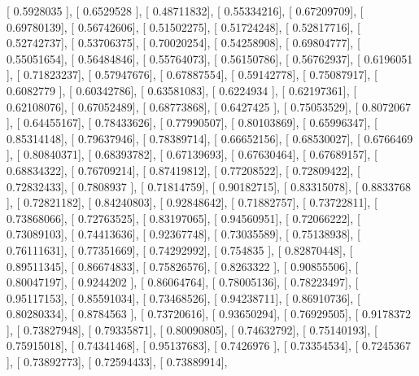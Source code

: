 \documentclass{article}
\begin{document}
       [ 0.5928035 ],
       [ 0.6529528 ],
       [ 0.48711832],
       [ 0.55334216],
       [ 0.67209709],
       [ 0.69780139],
       [ 0.56742606],
       [ 0.51502275],
       [ 0.51724248],
       [ 0.52817716],
       [ 0.52742737],
       [ 0.53706375],
       [ 0.70020254],
       [ 0.54258908],
       [ 0.69804777],
       [ 0.55051654],
       [ 0.56484846],
       [ 0.55764073],
       [ 0.56150786],
       [ 0.56762937],
       [ 0.6196051 ],
       [ 0.71823237],
       [ 0.57947676],
       [ 0.67887554],
       [ 0.59142778],
       [ 0.75087917],
       [ 0.6082779 ],
       [ 0.60342786],
       [ 0.63581083],
       [ 0.6224934 ],
       [ 0.62197361],
       [ 0.62108076],
       [ 0.67052489],
       [ 0.68773868],
       [ 0.6427425 ],
       [ 0.75053529],
       [ 0.8072067 ],
       [ 0.64455167],
       [ 0.78433626],
       [ 0.77990507],
       [ 0.80103869],
       [ 0.65996347],
       [ 0.85314148],
       [ 0.79637946],
       [ 0.78389714],
       [ 0.66652156],
       [ 0.68530027],
       [ 0.6766469 ],
       [ 0.80840371],
       [ 0.68393782],
       [ 0.67139693],
       [ 0.67630464],
       [ 0.67689157],
       [ 0.68834322],
       [ 0.76709214],
       [ 0.87419812],
       [ 0.77208522],
       [ 0.72809422],
       [ 0.72832433],
       [ 0.7808937 ],
       [ 0.71814759],
       [ 0.90182715],
       [ 0.83315078],
       [ 0.8833768 ],
       [ 0.72821182],
       [ 0.84240803],
       [ 0.92848642],
       [ 0.71882757],
       [ 0.73722811],
       [ 0.73868066],
       [ 0.72763525],
       [ 0.83197065],
       [ 0.94560951],
       [ 0.72066222],
       [ 0.73089103],
       [ 0.74413636],
       [ 0.92367748],
       [ 0.73035589],
       [ 0.75138938],
       [ 0.76111631],
       [ 0.77351669],
       [ 0.74292992],
       [ 0.754835  ],
       [ 0.82870448],
       [ 0.89511345],
       [ 0.86674833],
       [ 0.75826576],
       [ 0.8263322 ],
       [ 0.90855506],
       [ 0.80047197],
       [ 0.9244202 ],
       [ 0.86064764],
       [ 0.78005136],
       [ 0.78223497],
       [ 0.95117153],
       [ 0.85591034],
       [ 0.73468526],
       [ 0.94238711],
       [ 0.86910736],
       [ 0.80280334],
       [ 0.8784563 ],
       [ 0.73720616],
       [ 0.93650294],
       [ 0.76929505],
       [ 0.9178372 ],
       [ 0.73827948],
       [ 0.79335871],
       [ 0.80090805],
       [ 0.74632792],
       [ 0.75140193],
       [ 0.75915018],
       [ 0.74341468],
       [ 0.95137683],
       [ 0.7426976 ],
       [ 0.73354534],
       [ 0.7245367 ],
       [ 0.73892773],
       [ 0.72594433],
       [ 0.73889914],
\end{document}
